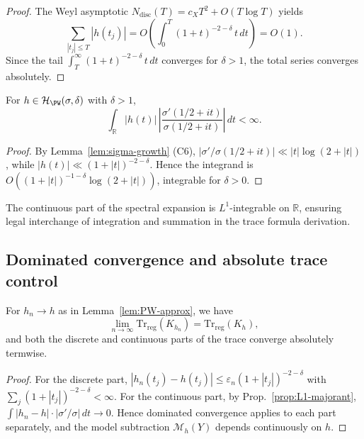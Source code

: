 \begin{proof}\relax
The Weyl asymptotic $N_{\mathrm{disc}}(T)=c_X T^2+O(T\log T)$ yields
\[
\sum_{|t_j|\le T}|h(t_j)| = O\!\left(\int_0^T (1+t)^{-2-\delta}\,t\,dt\right)=O(1).
\]
Since the tail $\int_T^\infty (1+t)^{-2-\delta}\,t\,dt$ converges for $\delta>1$, the total series converges absolutely. \relax
\end{proof}

\begin{proposition}\label{prop:L1-majorant}
For $h\in\mathcal{H}_{\PW}(\sigma,\delta)$ with $\delta>1$,
\[
  \int_{\mathbb{R}} |h(t)|\,\left|\frac{\sigma'(1/2+it)}{\sigma(1/2+it)}\right|\,dt < \infty.
\]
\end{proposition}

\begin{proof}\relax
By Lemma~\ref{lem:sigma-growth} (C6), $|\sigma'/\sigma(1/2+it)|\ll |t|\log(2+|t|)$, while $|h(t)|\ll (1+|t|)^{-2-\delta}$. Hence the integrand is $O((1+|t|)^{-1-\delta}\log(2+|t|))$, integrable for $\delta>0$. \relax
\end{proof}

\begin{invariant}[C7 — L¹ majorant]
\label{inv:C7}
The continuous part of the spectral expansion is $L^1$-integrable on $\mathbb{R}$, ensuring legal interchange of integration and summation in the trace formula derivation. \relax
\end{invariant}

\subsection{Dominated convergence and absolute trace control}
\label{subsec:ch4-part2-dominated} \relax

\begin{lemma}
\label{lem:dominated-conv-Kh}
For $h_n\to h$ as in Lemma~\ref{lem:PW-approx}, we have
\[
  \lim_{n\to\infty}\mathrm{Tr}_{\mathrm{reg}}(K_{h_n})
  = \mathrm{Tr}_{\mathrm{reg}}(K_{h}),
\]
and both the discrete and continuous parts of the trace converge absolutely termwise. \relax
\end{lemma}

\begin{proof}\relax
For the discrete part, $|h_n(t_j)-h(t_j)|\le \varepsilon_n(1+|t_j|)^{-2-\delta}$ with $\sum_j(1+|t_j|)^{-2-\delta}<\infty$. For the continuous part, by Prop.~\ref{prop:L1-majorant}, $\int |h_n-h|\cdot |\sigma'/\sigma|\,dt\to 0$. Hence dominated convergence applies to each part separately, and the model subtraction $\mathcal{M}_h(Y)$ depends continuously on $h$. \relax
\end{proof}

